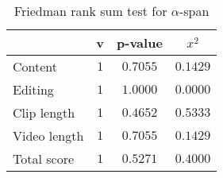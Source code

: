 \begin{table}[ht]
	\begin{center}
	\caption{Friedman rank sum test for $\alpha$-span}
	\label{tab:fried_alpha}
		\begin{tabular}{lccc}
		\toprule
			 & v & p-value & $x^2$\\
			\midrule
			Content & $1$ & $0.7055$ & $0.1429$\\
			Editing & $1$ & $1.0000$ & $0.0000$\\
			Clip length & $1$ & $0.4652$ & $0.5333$\\
			Video length & $1$ & $0.7055$ & $0.1429$\\
			Total score & $1$ & $0.5271$ & $0.4000$\\
		\bottomrule
		\end{tabular}
	\end{center}
\end{table}